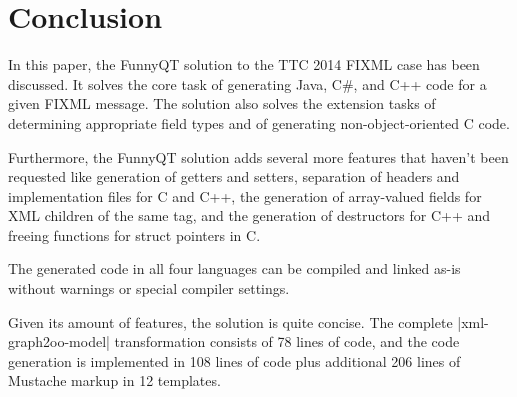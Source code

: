 \documentclass[submission]{eptcs}
\newcommand{\code}{\clojureinline}
\begin{document}
\section{Conclusion}
\label{sec:conclusion}

In this paper, the FunnyQT solution to the TTC 2014 FIXML case has been
discussed.  It solves the core task of generating Java, C\#, and C++ code for a
given FIXML message.  The solution also solves the extension tasks of
determining appropriate field types and of generating non-object-oriented C
code.

Furthermore, the FunnyQT solution adds several more features that haven't been
requested like generation of getters and setters, separation of headers and
implementation files for C and C++, the generation of array-valued fields for
XML children of the same tag, and the generation of destructors for C++ and
freeing functions for struct pointers in C.

The generated code in all four languages can be compiled and linked as-is
without warnings or special compiler settings.

Given its amount of features, the solution is quite concise.  The complete
\code|xml-graph2oo-model| transformation consists of 78 lines of code, and the
code generation is implemented in 108 lines of code plus additional 206 lines
of Mustache markup in 12 templates.












\end{document}
